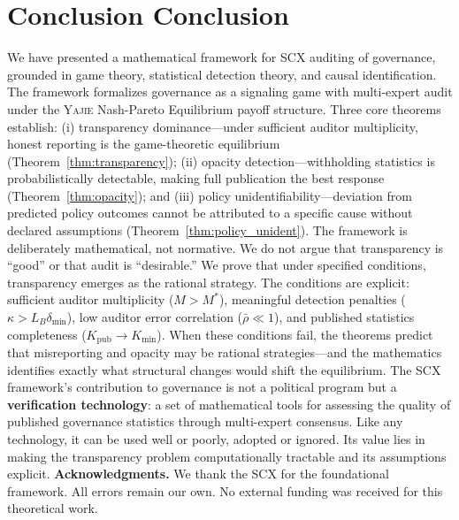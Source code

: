 \documentclass[11pt,a4paper]{article}
\theoremstyle{definition}
\newcommand{\Yajie}{\textsc{Yajie}}
\newcommand{\SCX}{\textsc{SCX}}
\begin{document}
\section{Conclusion Conclusion}
\label{sec:conclusion}
We have presented a mathematical framework for \SCX{} auditing of governance, grounded in game theory, statistical detection theory, and causal identification. The framework formalizes governance as a signaling game with multi-expert audit under the \Yajie{} Nash-Pareto Equilibrium payoff structure. Three core theorems establish: (i) transparency dominance---under sufficient auditor multiplicity, honest reporting is the game-theoretic equilibrium (Theorem~\ref{thm:transparency}); (ii) opacity detection---withholding statistics is probabilistically detectable, making full publication the best response (Theorem~\ref{thm:opacity}); and (iii) policy unidentifiability---deviation from predicted policy outcomes cannot be attributed to a specific cause without declared assumptions (Theorem~\ref{thm:policy_unident}).
The framework is deliberately mathematical, not normative. We do not argue that transparency is ``good'' or that audit is ``desirable.'' We prove that under specified conditions, transparency emerges as the rational strategy. The conditions are explicit: sufficient auditor multiplicity ($M > M^*$), meaningful detection penalties ($\kappa > L_B \delta_{\min}$), low auditor error correlation ($\bar{\rho} \ll 1$), and published statistics completeness ($K_{\mathrm{pub}} \to K_{\min}$). When these conditions fail, the theorems predict that misreporting and opacity may be rational strategies---and the mathematics identifies exactly what structural changes would shift the equilibrium.
The \SCX{} framework's contribution to governance is not a political program but a \textbf{verification technology}: a set of mathematical tools for assessing the quality of published governance statistics through multi-expert consensus. Like any technology, it can be used well or poorly, adopted or ignored. Its value lies in making the transparency problem computationally tractable and its assumptions explicit.
\medskip
\noindent\textbf{Acknowledgments.} We thank the SCX for the foundational framework. All errors remain our own. No external funding was received for this theoretical work.
\end{document}
